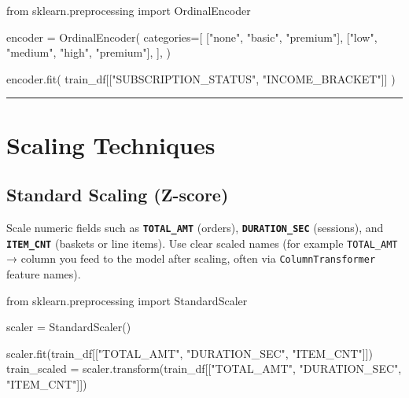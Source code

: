 \documentclass[
  letterpaper,
  DIV=11,
  numbers=noendperiod]{scrreprt}
\newenvironment{Shaded}{\begin{snugshade}}{\end{snugshade}}
\newcommand{\ImportTok}[1]{\textcolor[rgb]{0.00,0.46,0.62}{#1}}
\newcommand{\NormalTok}[1]{\textcolor[rgb]{0.00,0.23,0.31}{#1}}
\newcommand{\OperatorTok}[1]{\textcolor[rgb]{0.37,0.37,0.37}{#1}}
\newcommand{\StringTok}[1]{\textcolor[rgb]{0.13,0.47,0.30}{#1}}
\begin{document}
\begin{Shaded}
\begin{Highlighting}[]
\ImportTok{from}\NormalTok{ sklearn.preprocessing }\ImportTok{import}\NormalTok{ OrdinalEncoder}

\NormalTok{encoder }\OperatorTok{=}\NormalTok{ OrdinalEncoder(}
\NormalTok{    categories}\OperatorTok{=}\NormalTok{[}
\NormalTok{        [}\StringTok{"none"}\NormalTok{, }\StringTok{"basic"}\NormalTok{, }\StringTok{"premium"}\NormalTok{],}
\NormalTok{        [}\StringTok{"low"}\NormalTok{, }\StringTok{"medium"}\NormalTok{, }\StringTok{"high"}\NormalTok{, }\StringTok{"premium"}\NormalTok{],}
\NormalTok{    ],}
\NormalTok{)}

\NormalTok{encoder.fit(}
\NormalTok{    train\_df[[}\StringTok{"SUBSCRIPTION\_STATUS"}\NormalTok{, }\StringTok{"INCOME\_BRACKET"}\NormalTok{]]}
\NormalTok{)}
\end{Highlighting}
\end{Shaded}

\begin{center}\rule{0.5\linewidth}{0.5pt}\end{center}

\hypertarget{scaling-techniques}{%
\section{Scaling Techniques}\label{scaling-techniques}}

\hypertarget{standard-scaling-z-score}{%
\subsection{Standard Scaling (Z-score)}\label{standard-scaling-z-score}}

Scale numeric fields such as \textbf{\texttt{TOTAL\_AMT}} (orders),
\textbf{\texttt{DURATION\_SEC}} (sessions), and
\textbf{\texttt{ITEM\_CNT}} (baskets or line items). Use clear scaled
names (for example \texttt{TOTAL\_AMT} → column you feed to the model
after scaling, often via \texttt{ColumnTransformer} feature names).

\begin{Shaded}
\begin{Highlighting}[]
\ImportTok{from}\NormalTok{ sklearn.preprocessing }\ImportTok{import}\NormalTok{ StandardScaler}

\NormalTok{scaler }\OperatorTok{=}\NormalTok{ StandardScaler()}

\NormalTok{scaler.fit(train\_df[[}\StringTok{"TOTAL\_AMT"}\NormalTok{, }\StringTok{"DURATION\_SEC"}\NormalTok{, }\StringTok{"ITEM\_CNT"}\NormalTok{]])}
\NormalTok{train\_scaled }\OperatorTok{=}\NormalTok{ scaler.transform(train\_df[[}\StringTok{"TOTAL\_AMT"}\NormalTok{, }\StringTok{"DURATION\_SEC"}\NormalTok{, }\StringTok{"ITEM\_CNT"}\NormalTok{]])}
\end{Highlighting}
\end{Shaded}
\end{document}
